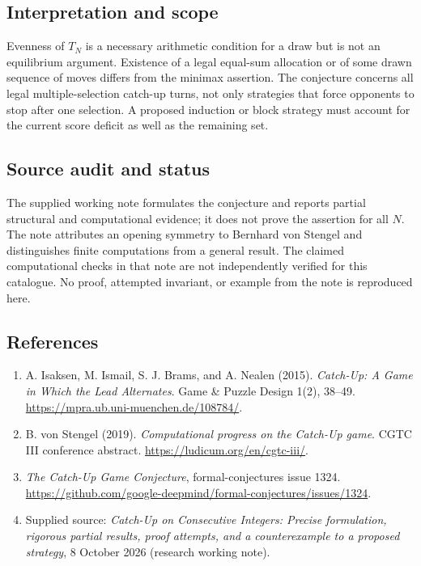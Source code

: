 \documentclass[11pt,a4paper]{article}
\begin{document}
\subsection*{Interpretation and scope}

Evenness of $T_N$ is a necessary arithmetic condition for a draw but is
not an equilibrium argument. Existence of a legal equal-sum allocation or
of some drawn sequence of moves differs from the minimax assertion.
The conjecture concerns all legal multiple-selection catch-up turns, not
only strategies that force opponents to stop after one selection. A
proposed induction or block strategy must account for the current score
deficit as well as the remaining set.

\subsection*{Source audit and status}

The supplied working note formulates the conjecture and reports partial
structural and computational evidence; it does not prove the assertion
for all $N$. The note attributes an opening symmetry to Bernhard von
Stengel and distinguishes finite computations from a general result.
The claimed computational checks in that note are not independently
verified for this catalogue. No proof, attempted invariant, or example
from the note is reproduced here.

\subsection*{References}

\begin{enumerate}
	\item[S1] A. Isaksen, M. Ismail, S. J. Brams, and A. Nealen (2015).
	\emph{Catch-Up: A Game in Which the Lead Alternates}.
	Game \& Puzzle Design 1(2), 38--49.
	\url{https://mpra.ub.uni-muenchen.de/108784/}.
	\item[S2] B. von Stengel (2019). \emph{Computational progress on the Catch-Up game}.
	CGTC III conference abstract. \url{https://ludicum.org/en/cgtc-iii/}.
	\item[S3] \emph{The Catch-Up Game Conjecture}, formal-conjectures issue 1324.
	\url{https://github.com/google-deepmind/formal-conjectures/issues/1324}.
	\item[S4] Supplied source: \emph{Catch-Up on Consecutive Integers: Precise
		formulation, rigorous partial results, proof attempts, and a counterexample
		to a proposed strategy}, 8 October 2026 (research working note).
\end{enumerate}
\end{document}
